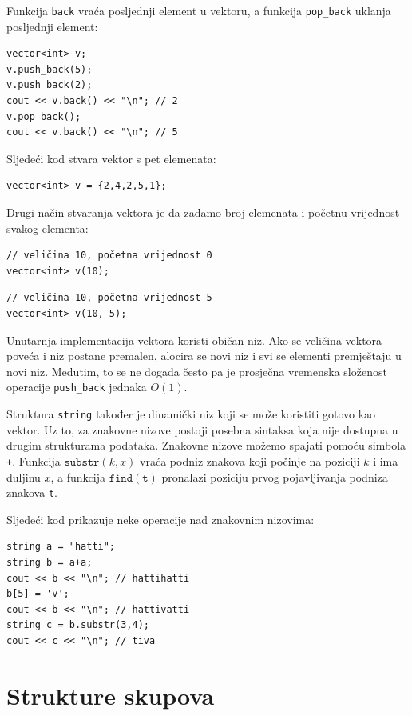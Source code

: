 Funkcija \texttt{back} vraća posljednji element
u vektoru, a
funkcija \texttt{pop\_back} uklanja posljednji element:

\begin{lstlisting}
vector<int> v;
v.push_back(5);
v.push_back(2);
cout << v.back() << "\n"; // 2
v.pop_back();
cout << v.back() << "\n"; // 5
\end{lstlisting}

Sljedeći kod stvara vektor s pet elemenata:

\begin{lstlisting}
vector<int> v = {2,4,2,5,1};
\end{lstlisting}

Drugi način stvaranja vektora je da zadamo broj
elemenata i početnu vrijednost svakog elementa:

\begin{lstlisting}
// veličina 10, početna vrijednost 0
vector<int> v(10);
\end{lstlisting}
\begin{lstlisting}
// veličina 10, početna vrijednost 5
vector<int> v(10, 5);
\end{lstlisting}

Unutarnja implementacija vektora
koristi običan niz.
Ako se veličina vektora poveća i
niz postane premalen,
alocira se novi niz i svi se
elementi premještaju u novi niz.
Međutim, to se ne događa često pa je
prosječna vremenska složenost operacije
\texttt{push\_back} jednaka $O(1)$.


Struktura \texttt{string}
također je dinamički niz koji se može koristiti gotovo kao vektor.
Uz to, za znakovne nizove postoji posebna sintaksa
koja nije dostupna u drugim strukturama podataka.
Znakovne nizove možemo spajati pomoću simbola \texttt{+}.
Funkcija $\texttt{substr}(k,x)$ vraća podniz znakova
koji počinje na poziciji $k$ i ima duljinu $x$,
a funkcija $\texttt{find}(\texttt{t})$ pronalazi poziciju
prvog pojavljivanja podniza znakova \texttt{t}.

Sljedeći kod prikazuje neke operacije nad znakovnim nizovima:

\begin{lstlisting}
string a = "hatti";
string b = a+a;
cout << b << "\n"; // hattihatti
b[5] = 'v';
cout << b << "\n"; // hattivatti
string c = b.substr(3,4);
cout << c << "\n"; // tiva
\end{lstlisting}

\section{Strukture skupova}

